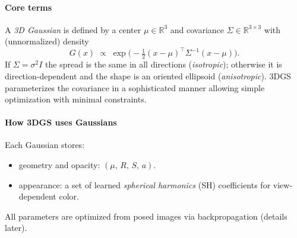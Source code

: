 \begin{enrichment}
\begin{enrichment}
\begin{enrichment}
        \paragraph{Core terms}
        A \emph{3D Gaussian} is defined by a center $\mu\in\mathbb{R}^3$ and covariance $\Sigma\in\mathbb{R}^{3\times3}$ with (unnormalized) density
        \[
        G(x)\;\propto\;\exp\!\Big(-\tfrac{1}{2}(x-\mu)^{\top}\Sigma^{-1}(x-\mu)\Big).
        \]
        If $\Sigma=\sigma^2 I$ the spread is the same in all directions (\emph{isotropic}); otherwise it is direction-dependent and the shape is an oriented ellipsoid (\emph{anisotropic}). 
        3DGS parameterizes the covariance in a sophisticated manner allowing simple optimization with minimal constraints. 
        
        \paragraph{How 3DGS uses Gaussians}
        Each Gaussian stores:
        \begin{itemize}
            \item geometry and opacity: $(\mu,\,R,\,S,\,a)$.
            \item appearance: a set of learned \emph{spherical harmonics} (SH) coefficients for view-dependent color.
        \end{itemize}
        All parameters are optimized from posed images via backpropagation (details later). 
        

\end{enrichment}
\end{enrichment}
\end{enrichment}
